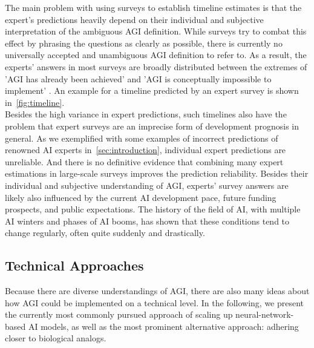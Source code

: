 The main problem with using surveys to establish timeline estimates is that the expert's predictions heavily depend on their individual and subjective interpretation of the ambiguous AGI definition.
While surveys try to combat this effect by phrasing the questions as clearly as possible, there is currently no universally accepted and unambiguous AGI definition to refer to.
As a result, the experts' answers in most surveys are broadly distributed between the extremes of 'AGI has already been achieved' \citep{al-sibai_openai_2024,arcas_artificial_2023} and 'AGI is conceptually impossible to implement' \citep{dreyfus_what_1992,fjelland_why_2020}.
An example for a timeline predicted by an expert survey is shown in~\cref{fig:timeline}.\\

Besides the high variance in expert predictions, such timelines also have the problem that expert surveys are an imprecise form of development prognosis in general.
As we exemplified with some examples of incorrect predictions of renowned AI experts in~\cref{sec:introduction}, individual expert predictions are unreliable.
And there is no definitive evidence that combining many expert estimations in large-scale surveys improves the prediction reliability.
Besides their individual and subjective understanding of AGI, experts' survey answers are likely also influenced by the current AI development pace, future funding prospects, and public expectations.
The history of the field of AI, with multiple AI winters and phases of AI booms, has shown that these conditions tend to change regularly, often quite suddenly and drastically.

\subsection{Technical Approaches}\label{sec:technical_approaches}
Because there are diverse understandings of AGI, there are also many ideas about how AGI could be implemented on a technical level.
In the following, we present the currently most commonly pursued approach of scaling up neural-network-based AI models, as well as the most prominent alternative approach: adhering closer to biological analogs.

